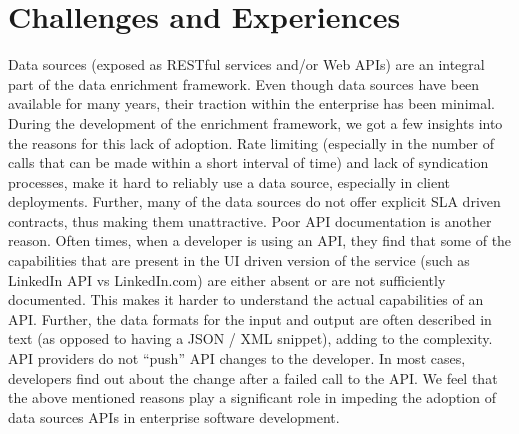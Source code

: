 \section{Challenges and Experiences}
Data sources (exposed as RESTful services and/or Web APIs) are an integral part of the data enrichment framework. Even though data sources have been available for many years, their traction within the enterprise has been minimal. During the 
development of the enrichment framework, we got a few insights into the reasons for this lack of adoption. Rate limiting (especially in the number of calls that can be made within a short interval of time) and lack of syndication
processes, make it hard to reliably use a data source, especially in client deployments. 
Further, many of the data sources do not offer explicit SLA driven contracts, thus making them unattractive. Poor API documentation is another reason. 
Often times, when a developer is using an API, they find that some of the capabilities that are present in the UI driven version of the service (such as LinkedIn API vs LinkedIn.com) are either absent or are not sufficiently 
documented. This makes it harder to understand the actual capabilities of an API. Further, the data formats for the input and output are often described in text (as opposed to having a JSON / XML snippet), adding to the complexity. 
API providers do not ``push'' API changes to the developer. In most cases, developers find out about the change after a failed call to the API. We feel that the above mentioned reasons play a significant role in impeding the adoption
of data sources APIs in enterprise software development.  
